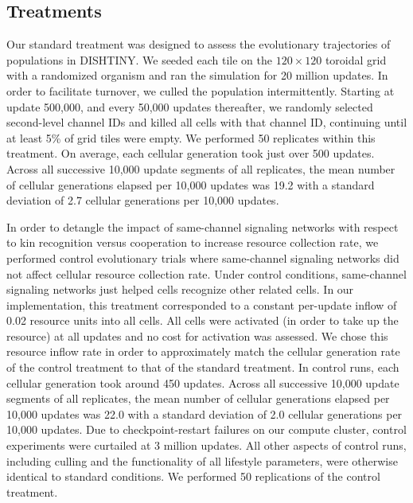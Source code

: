 {\subsection{Treatments}

Our standard treatment was designed to assess the evolutionary trajectories of populations in DISHTINY.
We seeded each tile on the $120 \times 120$ toroidal grid with a randomized organism and ran the simulation for 20 million updates.
In order to facilitate turnover, we culled the population intermittently.
Starting at update 500,000, and every 50,000 updates thereafter, we randomly selected second-level channel IDs and killed all cells with that channel ID, continuing until at least 5\% of grid tiles were empty.
We performed 50 replicates within this treatment.
On average, each cellular generation took just over 500 updates.
Across all successive 10,000 update segments of all replicates, the mean number of cellular generations elapsed per 10,000 updates was 19.2 with a standard deviation of 2.7 cellular generations per 10,000 updates.

In order to detangle the impact of same-channel signaling networks with respect to kin recognition versus cooperation to increase resource collection rate, we performed control evolutionary trials where same-channel signaling networks did not affect cellular resource collection rate.
Under control conditions, same-channel signaling networks just helped cells recognize other related cells.
In our implementation, this treatment corresponded to a constant per-update inflow of 0.02 resource units into all cells.
All cells were activated (in order to take up the resource) at all updates and no cost for activation was assessed.
We chose this resource inflow rate in order to approximately match the cellular generation rate of the control treatment to that of the standard treatment.
In control runs, each cellular generation took around 450 updates.
Across all successive 10,000 update segments of all replicates, the mean number of cellular generations elapsed per 10,000 updates was 22.0 with a standard deviation of 2.0 cellular generations per 10,000 updates.
Due to checkpoint-restart failures on our compute cluster, control experiments were curtailed at 3 million updates.
All other aspects of control runs, including culling and the functionality of all lifestyle parameters, were otherwise identical to standard conditions.
We performed 50 replications of the control treatment.

}
